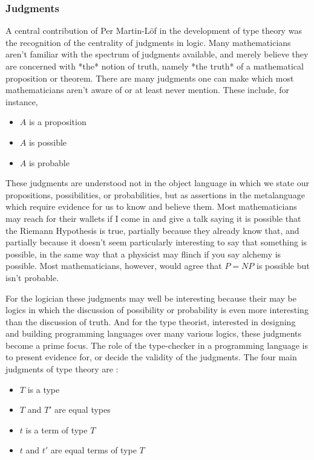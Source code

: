 \documentclass[11pt, a4paper]{article}
\begin{document}
\subsubsection{Judgments}

A central contribution of Per Martin-Löf in the development of type theory was
the recognition of the centrality of judgments in logic. Many mathematicians
aren't familiar with the spectrum of judgments available, and merely believe
they are concerned with *the* notion of truth, namely *the truth* of a
mathematical proposition or theorem. There are many judgments one can make which
most mathematicians aren't aware of or at least never mention. These include,
for instance,

\begin{itemize}[noitemsep]

\item $A$ is a proposition
\item $A$ is possible
\item $A$ is probable

\end{itemize}

These judgments are understood not in the object language in which we state our
propositions, possibilities, or probabilities, but as assertions in the
metalanguage which require evidence for us to know and believe them. Most
mathematicians may reach for their wallets if I come in and give a talk saying
it is possible that the Riemann Hypothesis is true, partially because they
already know that, and partially because it doesn't seem particularly
interesting to say that something is possible, in the same way that a physicist
may flinch if you say alchemy is possible. Most mathematicians, however, would
agree that $P = NP$ is possible but isn't probable.

For the logician these judgments may well be interesting because their may be
logics in which the discussion of possibility or probability is even more
interesting than the discussion of truth. And for the type theorist, interested
in designing and building programming languages over many various logics, these
judgments become a prime focus. The role of the type-checker in a programming
language is to present evidence for, or decide the validity of the judgments.
The four main judgments of type theory are :

\begin{itemize}[noitemsep]
\item $T$ is a type
\item $T$ and $T'$ are equal types
\item $t$ is a term of type $T$
\item $t$ and $t'$ are equal terms of type $T$
\end{itemize}
\end{document}
